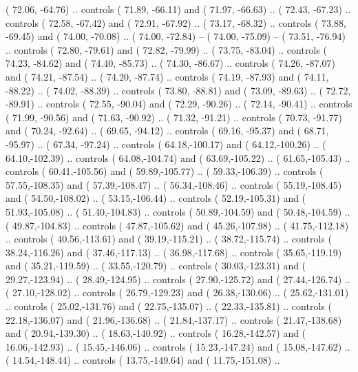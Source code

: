 {        (  72.06, -64.76) .. controls (  71.89, -66.11) and (  71.97, -66.63) ..
        (  72.43, -67.23) .. controls (  72.58, -67.42) and (  72.91, -67.92) ..
        (  73.17, -68.32) .. controls (  73.88, -69.45) and (  74.00, -70.08) ..
        (  74.00, -72.84) -- 
        (  74.00, -75.09) -- 
        (  73.51, -76.94) .. controls (  72.80, -79.61) and (  72.82, -79.99) ..
        (  73.75, -83.04) .. controls (  74.23, -84.62) and (  74.40, -85.73) ..
        (  74.30, -86.67) .. controls (  74.26, -87.07) and (  74.21, -87.54) ..
        (  74.20, -87.74) .. controls (  74.19, -87.93) and (  74.11, -88.22) ..
        (  74.02, -88.39) .. controls (  73.80, -88.81) and (  73.09, -89.63) ..
        (  72.72, -89.91) .. controls (  72.55, -90.04) and (  72.29, -90.26) ..
        (  72.14, -90.41) .. controls (  71.99, -90.56) and (  71.63, -90.92) ..
        (  71.32, -91.21) .. controls (  70.73, -91.77) and (  70.24, -92.64) ..
        (  69.65, -94.12) .. controls (  69.16, -95.37) and (  68.71, -95.97) ..
        (  67.34, -97.24) .. controls (  64.18,-100.17) and (  64.12,-100.26) ..
        (  64.10,-102.39) .. controls (  64.08,-104.74) and (  63.69,-105.22) ..
        (  61.65,-105.43) .. controls (  60.41,-105.56) and (  59.89,-105.77) ..
        (  59.33,-106.39) .. controls (  57.55,-108.35) and (  57.39,-108.47) ..
        (  56.34,-108.46) .. controls (  55.19,-108.45) and (  54.50,-108.02) ..
        (  53.15,-106.44) .. controls (  52.19,-105.31) and (  51.93,-105.08) ..
        (  51.40,-104.83) .. controls (  50.89,-104.59) and (  50.48,-104.59) ..
        (  49.87,-104.83) .. controls (  47.87,-105.62) and (  45.26,-107.98) ..
        (  41.75,-112.18) .. controls (  40.56,-113.61) and (  39.19,-115.21) ..
        (  38.72,-115.74) .. controls (  38.24,-116.26) and (  37.46,-117.13) ..
        (  36.98,-117.68) .. controls (  35.65,-119.19) and (  35.21,-119.59) ..
        (  33.55,-120.79) .. controls (  30.03,-123.31) and (  29.27,-123.94) ..
        (  28.49,-124.95) .. controls (  27.90,-125.72) and (  27.44,-126.74) ..
        (  27.10,-128.02) .. controls (  26.79,-129.23) and (  26.38,-130.06) ..
        (  25.62,-131.01) .. controls (  25.02,-131.76) and (  22.75,-135.07) ..
        (  22.33,-135.81) .. controls (  22.18,-136.07) and (  21.96,-136.68) ..
        (  21.84,-137.17) .. controls (  21.47,-138.68) and (  20.94,-139.30) ..
        (  18.63,-140.92) .. controls (  16.28,-142.57) and (  16.06,-142.93) ..
        (  15.45,-146.06) .. controls (  15.23,-147.24) and (  15.08,-147.62) ..
        (  14.54,-148.44) .. controls (  13.75,-149.64) and (  11.75,-151.08) ..
}

